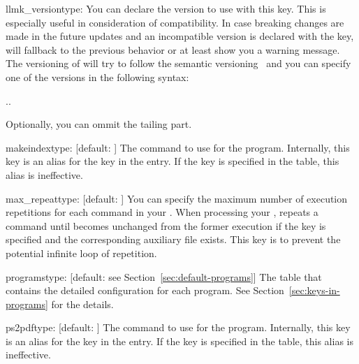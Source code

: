 \documentclass[draft]{llmk-doc}
\begin{document}
\begin{confkey}{llmk\_version}{type: }
You can declare the  version to use with this key. This is
especially useful in consideration of compatibility. In case breaking changes
are made in the future updates and an incompatible version is declared with the
key,  will fallback to the previous behavior or at least show you a
warning message. The versioning of  will try to follow the semantic
versioning~\cite{semvar} and you can specify one of the versions in the
following syntax:
%
\begin{htcode}
..
\end{htcode}
%
Optionally, you can ommit the tailing  part.
\end{confkey}

\begin{confkey}{makeindex}{type: }[default: ]
The command to use for the  program. Internally, this key
is an alias for the  key in the  entry. If
the  key is specified in the  table, this alias is
ineffective.
\end{confkey}

\begin{confkey}{max\_repeat}{type: }[default: ]
You can specify the maximum number of execution repetitions for each command in
your . When processing your ,  repeats
a command until  becomes unchanged from the former execution if
the key is specified and the corresponding auxiliary file exists. This key is to
prevent the potential infinite loop of repetition.
\end{confkey}

\begin{confkey}{programs}{type: }
  [default: see Section~\ref{sec:default-programs}]
The table that contains the detailed configuration for each program. See
Section~\ref{sec:keys-in-programs} for the details.
\end{confkey}

\begin{confkey}{ps2pdf}{type: }[default: ]
The command to use for the  program. Internally, this key is
an alias for the  key in the  entry. If the
 key is specified in the  table, this alias is
ineffective.
\end{confkey}
\end{document}

